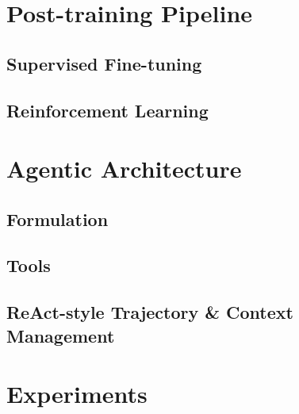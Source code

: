 \documentclass{article}
\begin{document}
\section{Post-training Pipeline}
\subsection{Supervised Fine-tuning}
\subsection{Reinforcement Learning}


\section{Agentic Architecture}
\subsection{Formulation}
\subsection{Tools}
\subsection{ReAct-style Trajectory \& Context Management}


\section{Experiments}
\end{document}
